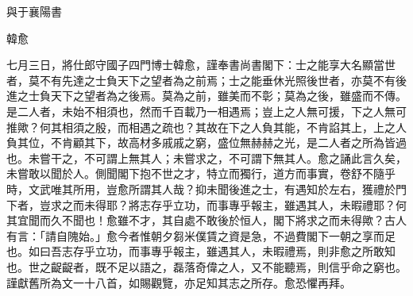 與于襄陽書

韓愈

七月三日，將仕郎守國子四門博士韓愈，謹奉書尚書閣下：士之能享大名顯當世者，莫不有先達之士負天下之望者為之前焉；士之能垂休光照後世者，亦莫不有後進之士負天下之望者為之後焉。莫為之前，雖美而不彰；莫為之後，雖盛而不傳。是二人者，未始不相須也，然而千百載乃一相遇焉；豈上之人無可援，下之人無可推歟？何其相須之殷，而相遇之疏也？其故在下之人負其能，不肯諂其上，上之人負其位，不肯顧其下，故高材多戚戚之窮，盛位無赫赫之光，是二人者之所為皆過也。未嘗干之，不可謂上無其人；未嘗求之，不可謂下無其人。愈之誦此言久矣，未嘗敢以聞於人。側聞閣下抱不世之才，特立而獨行，道方而事實，卷舒不隨乎時，文武唯其所用，豈愈所謂其人哉？抑未聞後進之士，有遇知於左右，獲禮於門下者，豈求之而未得耶？將志存乎立功，而事專乎報主，雖遇其人，未暇禮耶？何其宜聞而久不聞也！愈雖不才，其自處不敢後於恒人，閣下將求之而未得歟？古人有言：「請自隗始。」愈今者惟朝夕芻米僕賃之資是急，不過費閣下一朝之享而足也。如曰吾志存乎立功，而事專乎報主，雖遇其人，未暇禮焉，則非愈之所敢知也。世之齪齪者，既不足以語之，磊落奇偉之人，又不能聽焉，則信乎命之窮也。謹獻舊所為文一十八首，如賜觀覽，亦足知其志之所存。愈恐懼再拜。